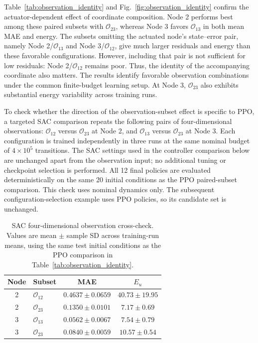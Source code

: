 \documentclass[a4paper,fleqn]{cas-dc}
\theoremstyle{plain}
\theoremstyle{definition}
\begin{document}
Table~\ref{tab:observation_identity} and Fig.~\ref{fig:observation_identity} confirm the actuator-dependent effect of coordinate composition. Node 2 performs best among these paired subsets with $\mathcal O_{23}$, whereas Node 3 favors $\mathcal O_{13}$ in both mean MAE and energy. The subsets omitting the actuated node's state--error pair, namely Node 2/$\mathcal O_{13}$ and Node 3/$\mathcal O_{12}$, give much larger residuals and energy than these favorable configurations. However, including that pair is not sufficient for low residuals: Node 2/$\mathcal O_{12}$ remains poor. Thus, the identity of the accompanying coordinate also matters. The results identify favorable observation combinations under the common finite-budget learning setup. At Node 3, $\mathcal O_{23}$ also exhibits substantial energy variability across training runs.

To check whether the direction of the observation-subset effect is specific to PPO, a targeted SAC comparison repeats the following pairs of four-dimensional observations: $\mathcal O_{12}$ versus $\mathcal O_{23}$ at Node 2, and $\mathcal O_{13}$ versus $\mathcal O_{23}$ at Node 3. Each configuration is trained independently in three runs at the same nominal budget of $4\times10^5$ transitions. The SAC settings used in the controller comparison below are unchanged apart from the observation input; no additional tuning or checkpoint selection is performed. All 12 final policies are evaluated deterministically on the same 20 initial conditions as the PPO paired-subset comparison. This check uses nominal dynamics only. The subsequent configuration-selection example uses PPO policies, so its candidate set is unchanged.

\begin{table}[pos=htbp,width=\linewidth]
\centering\small
\setlength{\tabcolsep}{3pt}
\caption{SAC four-dimensional observation cross-check. Values are mean $\pm$ sample SD across training-run means, using the same test initial conditions as the PPO comparison in Table~\ref{tab:observation_identity}.}
\label{tab:sac_observation_check}
\begin{tabular}{@{}clcc@{}}
\toprule
Node & Subset & MAE & $E_u$ \\
\midrule
2 & $\mathcal O_{12}$ & $0.4637\pm0.0659$ & $40.73\pm19.95$ \\
2 & $\mathcal O_{23}$ & $0.1350\pm0.0101$ & $7.17\pm0.69$ \\
3 & $\mathcal O_{13}$ & $0.0562\pm0.0067$ & $7.54\pm0.79$ \\
3 & $\mathcal O_{23}$ & $0.0840\pm0.0059$ & $10.57\pm0.54$ \\
\bottomrule
\end{tabular}
\end{table}
\end{document}

